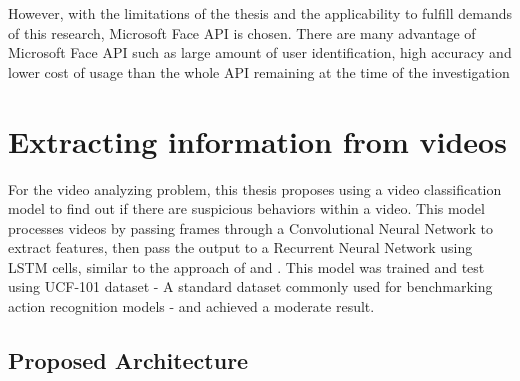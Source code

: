 However, with the limitations of the thesis and the applicability to fulfill demands of this research, Microsoft Face API is chosen. There are many advantage of Microsoft Face API such as large amount of user identification, high accuracy and lower cost of usage than the whole API remaining at the time of the investigation


\section{Extracting information from videos}
For the video analyzing problem, this thesis proposes using a video classification model to find out if there are suspicious behaviors within a video. This model processes videos by passing frames through a Convolutional Neural Network to extract features, then pass the output to a Recurrent Neural Network using LSTM cells, similar to the approach of \cite{DBLP:journals/corr/DonahueHGRVSD14} and \cite{}. This model was trained and test using UCF-101 dataset - A standard dataset commonly used for benchmarking action recognition models - and achieved a moderate result.
\subsection{Proposed Architecture}
